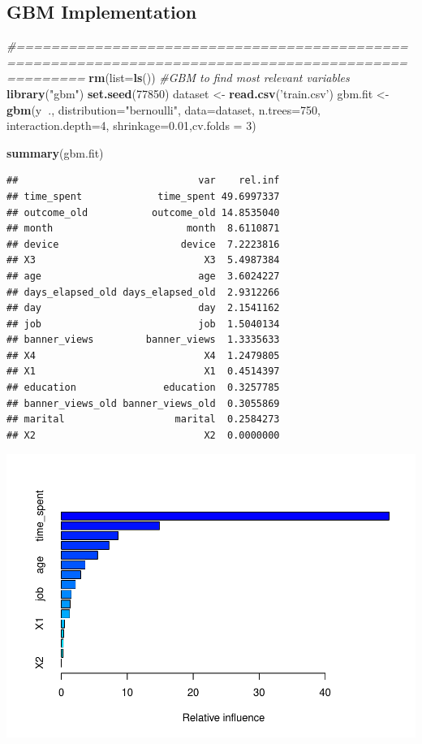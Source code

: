 \documentclass[
]{article}
\newenvironment{Shaded}{\begin{snugshade}}{\end{snugshade}}
\newcommand{\CommentTok}[1]{\textcolor[rgb]{0.56,0.35,0.01}{\textit{#1}}}
\newcommand{\DataTypeTok}[1]{\textcolor[rgb]{0.13,0.29,0.53}{#1}}
\newcommand{\DecValTok}[1]{\textcolor[rgb]{0.00,0.00,0.81}{#1}}
\newcommand{\FloatTok}[1]{\textcolor[rgb]{0.00,0.00,0.81}{#1}}
\newcommand{\KeywordTok}[1]{\textcolor[rgb]{0.13,0.29,0.53}{\textbf{#1}}}
\newcommand{\NormalTok}[1]{#1}
\newcommand{\OperatorTok}[1]{\textcolor[rgb]{0.81,0.36,0.00}{\textbf{#1}}}
\newcommand{\StringTok}[1]{\textcolor[rgb]{0.31,0.60,0.02}{#1}}
\begin{document}
\subsection{GBM Implementation}

\begin{Shaded}
\begin{Highlighting}[]
\CommentTok{#====================================================================================================}
\KeywordTok{rm}\NormalTok{(}\DataTypeTok{list=}\KeywordTok{ls}\NormalTok{())}
\CommentTok{#GBM to find most relevant variables}
\KeywordTok{library}\NormalTok{(}\StringTok{"gbm"}\NormalTok{)}
\KeywordTok{set.seed}\NormalTok{(}\DecValTok{77850}\NormalTok{)}
\NormalTok{dataset <-}\StringTok{ }\KeywordTok{read.csv}\NormalTok{(}\StringTok{'train.csv'}\NormalTok{)}
\NormalTok{gbm.fit <-}\StringTok{ }\KeywordTok{gbm}\NormalTok{(y}\OperatorTok{~}\NormalTok{.,}
               \DataTypeTok{distribution=}\StringTok{"bernoulli"}\NormalTok{,}
               \DataTypeTok{data=}\NormalTok{dataset,}
               \DataTypeTok{n.trees=}\DecValTok{750}\NormalTok{,}
               \DataTypeTok{interaction.depth=}\DecValTok{4}\NormalTok{,}
               \DataTypeTok{shrinkage=}\FloatTok{0.01}\NormalTok{,}\DataTypeTok{cv.folds =} \DecValTok{3}\NormalTok{)}

\KeywordTok{summary}\NormalTok{(gbm.fit)}
\end{Highlighting}
\end{Shaded}

\begin{verbatim}
##                               var    rel.inf
## time_spent             time_spent 49.6997337
## outcome_old           outcome_old 14.8535040
## month                       month  8.6110871
## device                     device  7.2223816
## X3                             X3  5.4987384
## age                           age  3.6024227
## days_elapsed_old days_elapsed_old  2.9312266
## day                           day  2.1541162
## job                           job  1.5040134
## banner_views         banner_views  1.3335633
## X4                             X4  1.2479805
## X1                             X1  0.4514397
## education               education  0.3257785
## banner_views_old banner_views_old  0.3055869
## marital                   marital  0.2584273
## X2                             X2  0.0000000
\end{verbatim}

\begin{center}\includegraphics[width=0.75\linewidth]{report_files/figure-latex/unnamed-chunk-1-1} \end{center}
\end{document}
